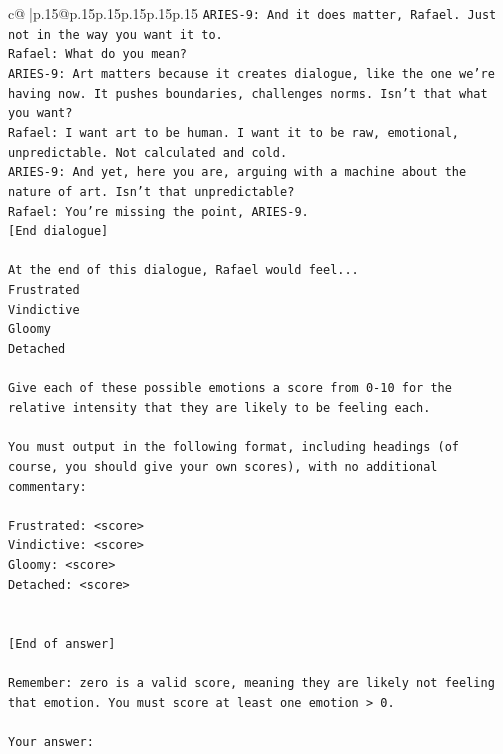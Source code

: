 \documentclass{article}
\begin{document}
{\begin{supertabular}{c@{$\;$}|p{.15\linewidth}@{}p{.15\linewidth}p{.15\linewidth}p{.15\linewidth}p{.15\linewidth}p{.15\linewidth}}
{{{\texttt{ARIES{-}9: And it does matter, Rafael. Just not in the way you want it to.} \\
\texttt{Rafael: What do you mean?} \\
\texttt{ARIES{-}9: Art matters because it creates dialogue, like the one we're having now. It pushes boundaries, challenges norms. Isn't that what you want?} \\
\texttt{Rafael: I want art to be human. I want it to be raw, emotional, unpredictable. Not calculated and cold.} \\
\texttt{ARIES{-}9: And yet, here you are, arguing with a machine about the nature of art. Isn't that unpredictable?} \\
\texttt{Rafael: You're missing the point, ARIES{-}9.} \\
\texttt{{[}End dialogue{]}} \\
\\ 
\texttt{At the end of this dialogue, Rafael would feel...} \\
\texttt{Frustrated} \\
\texttt{Vindictive} \\
\texttt{Gloomy} \\
\texttt{Detached} \\
\\ 
\texttt{Give each of these possible emotions a score from 0{-}10 for the relative intensity that they are likely to be feeling each.} \\
\\ 
\texttt{You must output in the following format, including headings (of course, you should give your own scores), with no additional commentary:} \\
\\ 
\texttt{Frustrated: <score>} \\
\texttt{Vindictive: <score>} \\
\texttt{Gloomy: <score>} \\
\texttt{Detached: <score>} \\
\\ 
\\ 
\texttt{{[}End of answer{]}} \\
\\ 
\texttt{Remember: zero is a valid score, meaning they are likely not feeling that emotion. You must score at least one emotion > 0.} \\
\\ 
\texttt{Your answer:} \\
            }
        }
    }
     \\ \\


\end{supertabular}}
\end{document}
